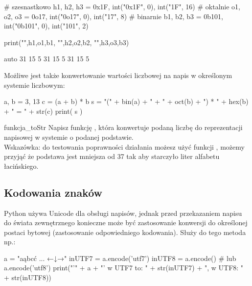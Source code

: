 \documentclass{pdfBooklets}
\begin{document}
\begin{CodeFrame}[python]{0.7\textwidth}
# szesnastkowo
h1, h2, h3 = 0x1F, int("0x1F", 0), int("1F", 16)
# oktalnie
o1, o2, o3 = 0o17, int("0o17", 0), int("17", 8)
# binarnie
b1, b2, b3 = 0b101, int("0b101", 0), int("101", 2)

print("",h1,o1,b1, "\n",h2,o2,b2, "\n",h3,o3,b3)
\end{CodeFrame}
\begin{CodeFrame}{auto}
 31 15 5
 31 15 5
 31 15 5
\end{CodeFrame}

Możliwe jest także konwertowanie wartości liczbowej na napis w określonym systemie liczbowym:

\begin{CodeFrame*}[python]{}
a, b = 3, 13
c = (a + b) * b
s = "(" + bin(a) + " + " + oct(b) + ") * " + hex(b) + " = " + str(c)
print( s )
\end{CodeFrame*} 

\begin{Zadanie}{}{funkcja_toStr}
Napisz funkcję , która konwertuje podaną liczbę do reprezentacji napisowej w systemie o podanej podstawie.\\
Wskazówka: do testowania poprawności działania możesz użyć funkcji , możemy przyjąć że podstawa jest mniejsza od 37 tak aby starczyło liter alfabetu łacińskiego.
\end{Zadanie}

\subsection{Kodowania znaków}

Python używa Unicode dla obsługi napisów, jednak przed przekazaniem napisu do świata zewnętrznego konieczne może być zastosowanie konwersji do określonej postaci bytowej (zastosowanie odpowiedniego kodowania).
Służy do tego metoda  np.:

\begin{CodeFrame*}[python]{}
a = "aąbcć ... ←↓→"
inUTF7 = a.encode('utf7')
inUTF8 =  a.encode() # lub a.encode('utf8')
print("'" + a + "' w UTF7 to: " + str(inUTF7) + ", w UTF8: " + str(inUTF8))
\end{CodeFrame*}
\end{document}
